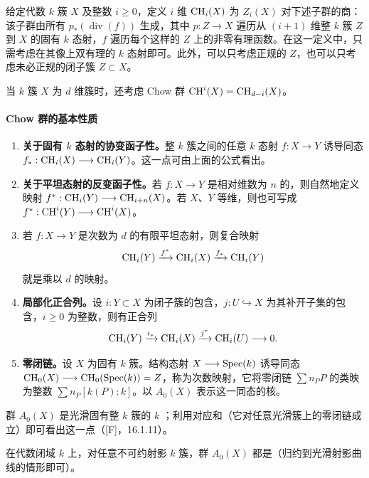 给定代数 $k$ 簇 $X$ 及整数 $i\ge0$，定义 $i$ 维 $\operatorname{CH}_i(X)$ 为 $Z_i(X)$ 对下述子群的商：该子群由所有 $p_*(\operatorname{div}(f))$ 生成，其中 $p:Z\longrightarrow X$ 遍历从 $(i+1)$ 维整 $k$ 簇 $Z$ 到 $X$ 的固有 $k$ 态射，$f$ 遍历每个这样的 $Z$ 上的非零有理函数。在这一定义中，只需考虑在其像上双有理的 $k$ 态射即可。此外，可以只考虑正规的 $Z$，也可以只考虑未必正规的闭子簇 $Z\subset X$。

当 $k$ 簇 $X$ 为 $d$ 维簇时，还考虑 Chow 群 $\operatorname{CH}^i(X)=\operatorname{CH}_{d-i}(X)$。

\paragraph{Chow 群的基本性质}
\begin{enumerate}[label=\arabic*)]
\item \textbf{关于固有 $k$ 态射的协变函子性。}整 $k$ 簇之间的任意 $k$ 态射 $f:X\longrightarrow Y$ 诱导同态 $f_*:\operatorname{CH}_i(X)\longrightarrow\operatorname{CH}_i(Y)$。这一点可由上面的公式看出。
\item \textbf{关于平坦态射的反变函子性。}若 $f:X\longrightarrow Y$ 是相对维数为 $n$ 的，则自然地定义映射 $f^*:\operatorname{CH}_i(Y)\longrightarrow\operatorname{CH}_{i+n}(X)$。若 $X$、$Y$ 等维，则也可写成 $f^*:\operatorname{CH}^i(Y)\longrightarrow\operatorname{CH}^i(X)$。
\item 若 $f:X\longrightarrow Y$ 是次数为 $d$ 的有限平坦态射，则复合映射
\[
\operatorname{CH}_i(Y)\xrightarrow{f^*}\operatorname{CH}_i(X)\xrightarrow{f_*}\operatorname{CH}_i(Y)
\]
就是乘以 $d$ 的映射。
\item \textbf{局部化正合列。}设 $i:Y\subset X$ 为闭子簇的包含，$j:U\hookrightarrow X$ 为其补开子集的包含，$i\ge0$ 为整数，则有正合列
\[
\operatorname{CH}_i(Y)\xrightarrow{i_*}\operatorname{CH}_i(X)\xrightarrow{j^*}\operatorname{CH}_i(U)\longrightarrow0.
\]
\item \textbf{零闭链。}设 $X$ 为固有 $k$ 簇。结构态射 $X\longrightarrow\operatorname{Spec}(k)$ 诱导同态 $\operatorname{CH}_0(X)\longrightarrow\operatorname{CH}_0(\operatorname{Spec}(k))=Z$，称为次数映射，它将零闭链 $\sum n_PP$ 的类映为整数 $\sum n_P[k(P):k]$。以 $A_0(X)$ 表示这一同态的核。
\end{enumerate}
群 $A_0(X)$ 是光滑固有整 $k$ 簇的 $k$ ；利用对应和（它对任意光滑簇上的零闭链成立）即可看出这一点（[F]，16.1.11）。

在代数闭域 $k$ 上，对任意不可约射影 $k$ 簇，群 $A_0(X)$ 都是（归约到光滑射影曲线的情形即可）。


